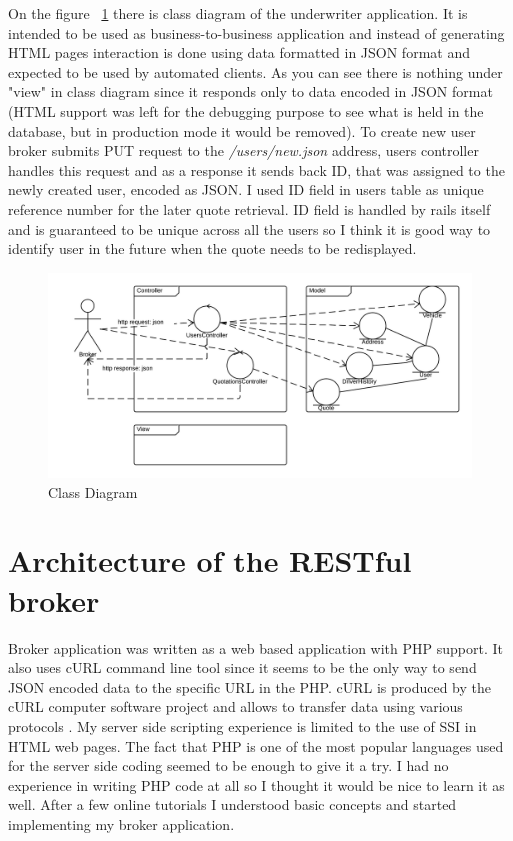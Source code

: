 \documentclass[10pt,a4paper,headinclude=true,twoside]{report}
\begin{document}
On the figure ~\ref{fig:ClassDesign} there is class diagram of the underwriter application. It is intended to be used as business-to-business application and instead of generating HTML pages interaction is done using data formatted in JSON format and expected to be used by automated clients. As you can see there is nothing under "view" in class diagram since it responds only to data encoded in JSON format (HTML support was left for the debugging purpose to see what is held in the database, but in production mode it would be removed). To create new user broker submits PUT request to the \textit{/users/new.json} address, users controller handles this request and as a response it sends back ID, that was assigned to the newly created user, encoded as JSON. I used ID field in users table as unique reference number for the later quote retrieval. ID field is handled by rails itself and is guaranteed to be unique across all the users so I think it is good way to identify user in the future when the quote needs to be redisplayed. 

\begin{figure}[H]
\centering
\centerline{\includegraphics[scale=0.25]{./ClassDesign}}
\caption{Class Diagram}
\label{fig:ClassDesign}
\end{figure}



\section{Architecture of the RESTful broker}
Broker application was written as a web based application with PHP support. It also uses cURL command line tool since it seems to be the only way to send JSON encoded data to the specific URL in the PHP. cURL is produced by the cURL computer software project and allows to transfer data using various protocols \cite{cURL}. My server side scripting experience is limited to the use of SSI in HTML web pages. The fact that PHP is one of the most popular languages used for the server side coding \cite{PHP} seemed to be enough to give it a try. I had no experience in writing PHP code at all so I thought it would be nice to learn it as well. After a few online tutorials I understood basic concepts and started implementing my broker application.
\end{document}
